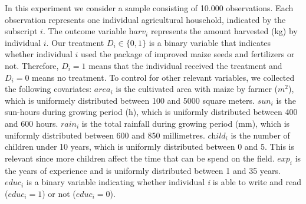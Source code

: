 In this experiment we consider a sample consisting of 10.000 observations. Each observation represents one individual agricultural household, indicated by the subscript $\textit{i}$. The outcome variable $\textit{harv}_i$ represents the amount harvested (kg) by individual $\textit{i}$. Our treatment $\textit{D}_i \in \{0,1\}$ is a binary variable that indicates whether individual $\textit{i}$ used the package of improved maize seeds and fertilizers or not. Therefore, $\textit{D}_i = 1$ means that the individual received the treatment and $\textit{D}_i = 0$ means no treatment. To control for other relevant variables, we collected the following covariates: $\textit{area}_i$ is the cultivated area with maize by farmer ($m^2$), which is uniformely distributed between 100 and 5000 square meters. $\textit{sun}_i$ is the sun-hours during growing period (h), which is uniformly distributed between 400 and 600 hours. $\textit{rain}_i$ is the total rainfall during growing period (mm), which is uniformly distributed between 600 and 850 millimetres. $\textit{child}_i$ is the number of children under 10 years, which is uniformly distributed between 0 and 5. This is relevant since more children affect the time that can be spend on the field. $\textit{exp}_i$ is the years of experience and is uniformly distributed between 1 and 35 years. $\textit{educ}_i$ is a binary variable indicating whether individual \textit{i} is able to write and read ($\textit{educ}_i = 1$) or not ($\textit{educ}_i = 0$). \\



